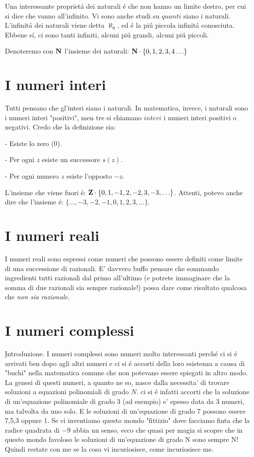 Una interessante propriet\'a dei naturali \'e che non hanno un limite destro, per cui si dice che vanno all'infinito. Vi sono anche studi su $quanti$ siano i naturali.
L'infinit\'a dei naturali viene detta $\aleph_0$, ed \'e la pi\'u piccola infinit\'a conosciuta. Ebbene s\'i, ci sono tanti infiniti, alcuni pi\'u grandi, alcuni pi\'u piccoli.

Denoteremo con $\mathbf{N}$ l'insieme dei naturali: $\mathbf{N}\cdot\{0,1,2,3,4\ldots\}$


\section{I numeri interi}

Tutti pensano che gl'interi siano i naturali. In matematica, invece, i naturali sono i numeri interi "positivi", men tre si chiamano $interi$ i numeri interi positivi o negativi.
Credo che la definizione sia:

- Esiste lo zero ($0$).

- Per ogni $z$ esiste un successore $s(z)$.

- Per ogni numero $z$ esiste l'opposto $-z$.

L'insieme che viene fuori \'e: $\mathbf{Z} \cdot \{0,1,-1,2,-2,3,-3,\ldots\}$. Attenti, potevo anche dire che l'insieme \'e: $\{\ldots,-3,-2,-1,0,1,2,3,\ldots\}$.


\section{I numeri reali}

I numeri reali sono espressi come numeri che possono essere definiti come limite di una successione di razionali. E' davvero buffo pensare che sommando ingredienti tutti razionali dal primo all'ultimo (e potrete immaginare che la somma di due razionali sia sempre razionale!) possa dare come risultato qualcosa che \em{ non} sia razionale.


\section{I numeri complessi}

\b{Introduzione}.
I numeri complessi sono numeri molto interessanti perch\'e ci si \'e arrivati ben dopo agli altri numeri e ci si \'e accorti della loro esistenza a causa di "buchi" nella matematica comune 
che non potevano essere spiegati in altro modo. La genesi di questi numeri, a quanto ne so, nasce dalla necessita' di trovare soluzioni a equazioni polinomiali di grado $N$. ci si \'e infatti
accorti che la soluzione di un'equazione polinomiale di grado 3 (ad esempio) e' spesso data da 3 numeri, ma talvolta da uno solo. E le soluzioni di un'equazione di grado 7 possono essere 7,5,3 oppure 1.
Se ci inventiamo questo mondo "fittizio" dove facciamo finta che la radice quadrata di $-9$ abbia un senso, ecco che quasi per magia si scopre che in questo mondo favoloso le soluzioni di un'equazione
di grado N sono sempre N! Quindi restate con me se la cosa vi incuriosisce, come incuriosisce me.
 

